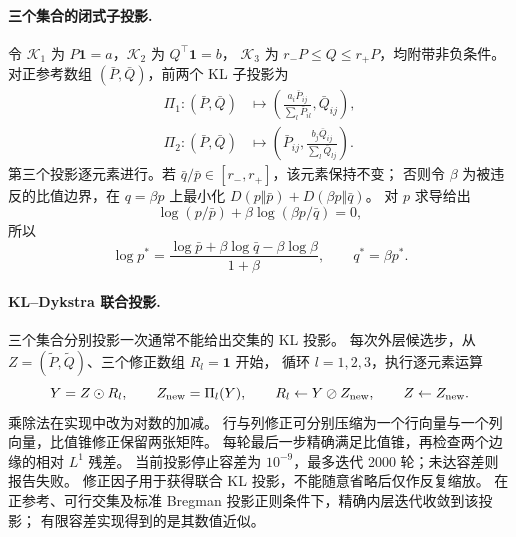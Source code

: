 \documentclass[UTF8,a4paper,11pt,fontset=fandol]{ctexart}
\begin{document}
\paragraph{三个集合的闭式子投影.}
令 $\mathcal K_1$ 为 $P\mathbf1=a$，$\mathcal K_2$ 为 $Q^\top\mathbf1=b$，
$\mathcal K_3$ 为 $r_-P\le Q\le r_+P$，均附带非负条件。
对正参考数组 $(\bar P,\bar Q)$，前两个 KL 子投影为
\begin{equation}
\begin{aligned}
\Pi_1:(\bar P,\bar Q)&\mapsto
\left(\frac{a_i\bar P_{ij}}{\sum_l\bar P_{il}},\bar Q_{ij}\right),\\
\Pi_2:(\bar P,\bar Q)&\mapsto
\left(\bar P_{ij},\frac{b_j\bar Q_{ij}}{\sum_l\bar Q_{lj}}\right).
\end{aligned}
\end{equation}
第三个投影逐元素进行。若 $\bar q/\bar p\in[r_-,r_+]$，该元素保持不变；
否则令 $\beta$ 为被违反的比值边界，在 $q=\beta p$ 上最小化
$D(p\Vert\bar p)+D(\beta p\Vert\bar q)$。
对 $p$ 求导给出
\begin{equation}
\log(p/\bar p)+\beta\log(\beta p/\bar q)=0,
\end{equation}
所以
\begin{equation}
\boxed{\log p^*=\frac{\log\bar p+\beta\log\bar q-\beta\log\beta}{1+\beta},
\qquad q^*=\beta p^*.}
\label{eq:ratio-cone-kl-projection}
\end{equation}

\paragraph{KL--Dykstra 联合投影.}
三个集合分别投影一次通常不能给出交集的 KL 投影。
每次外层候选步，从 $Z=(\widetilde P,\widetilde Q)$、三个修正数组 $R_l=\mathbf1$ 开始，
循环 $l=1,2,3$，执行逐元素运算
\begin{equation}
Y=Z\odot R_l,\qquad Z_{\rm new}=\Pi_l(Y),\qquad
R_l\leftarrow Y\oslash Z_{\rm new},\qquad Z\leftarrow Z_{\rm new}.
\label{eq:kl-dykstra-cycle}
\end{equation}
乘除法在实现中改为对数的加减。
行与列修正可分别压缩为一个行向量与一个列向量，比值锥修正保留两张矩阵。
每轮最后一步精确满足比值锥，再检查两个边缘的相对 $L^1$ 残差。
当前投影停止容差为 $10^{-9}$，最多迭代 2000 轮；未达容差则报告失败。
修正因子用于获得联合 KL 投影，不能随意省略后仅作反复缩放。
在正参考、可行交集及标准 Bregman 投影正则条件下，精确内层迭代收敛到该投影；
有限容差实现得到的是其数值近似。
\end{document}
